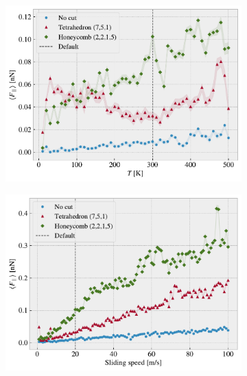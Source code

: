 \begin{figure}[!htb]
  \centering
  \begin{subfigure}[t]{0.49\textwidth}
      \centering
      \includegraphics[width=\textwidth]{figures/baseline/variables_temp_mean_fixmove_v20.pdf}
      \caption{}
      \label{fig:var_temp}
    \end{subfigure}
    \hfill
    \begin{subfigure}[t]{0.49\textwidth}
      \centering
      \includegraphics[width=\textwidth]{figures/baseline/variables_vel_mean_fixmove.pdf}
      \caption{}
      \label{fig:var_vel}
    \end{subfigure}
    \hfill
    \begin{subfigure}[t]{0.49\textwidth}

\end{subfigure}
\end{figure}
